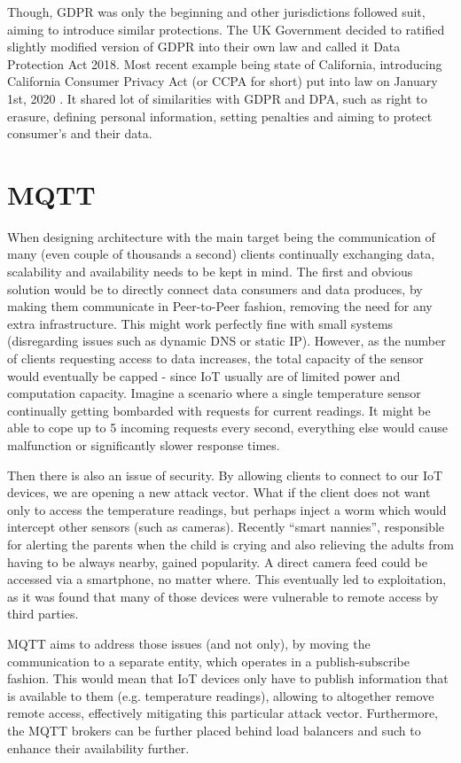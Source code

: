 Though, GDPR was only the beginning and other jurisdictions followed suit, aiming to introduce similar protections. The UK Government decided to ratified slightly modified version of GDPR into their own law and called it Data Protection Act 2018. Most recent example being state of California, introducing California Consumer Privacy Act (or CCPA for short) put into law on January 1st, 2020 \citep{CCPA}. It shared lot of similarities with GDPR and DPA, such as right to erasure, defining personal information, setting penalties and aiming to protect consumer's and their data.

\section{MQTT}
When designing architecture with the main target being the communication of many (even couple of thousands a second) clients continually exchanging data, scalability and availability needs to be kept in mind. The first and obvious solution would be to directly connect data consumers and data produces, by making them communicate in Peer-to-Peer fashion, removing the need for any extra infrastructure. This might work perfectly fine with small systems (disregarding issues such as dynamic DNS or static IP). However, as the number of clients requesting access to data increases, the total capacity of the sensor would eventually be capped - since IoT usually are of limited power and computation capacity. Imagine a scenario where a single temperature sensor continually getting bombarded with requests for current readings. It might be able to cope up to 5 incoming requests every second, everything else would cause malfunction or significantly slower response times.

Then there is also an issue of security. By allowing clients to connect to our IoT devices, we are opening a new attack vector. What if the client does not want only to access the temperature readings, but perhaps inject a worm which would intercept other sensors (such as cameras). Recently ``smart nannies'', responsible for alerting the parents when the child is crying and also relieving the adults from having to be always nearby, gained popularity. A direct camera feed could be accessed via a smartphone, no matter where. This eventually led to exploitation, as it was found that many of those devices were vulnerable to remote access by third parties\cite{pultarova2016webcam}.

MQTT aims to address those issues (and not only), by moving the communication to a separate entity, which operates in a publish-subscribe fashion. This would mean that IoT devices only have to publish information that is available to them (e.g. temperature readings), allowing to altogether remove remote access, effectively mitigating this particular attack vector. Furthermore, the MQTT brokers can be further placed behind load balancers and such to enhance their availability further.

